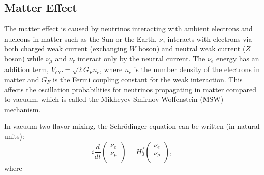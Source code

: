 %


\subsection{Matter Effect}

The matter effect is caused by neutrinos interacting with ambient electrons and nucleons in matter such as the Sun or the Earth. $\nu_e$ interacts with electrons via both charged weak current (exchanging $W$ boson) and neutral weak current ($Z$ boson) while $\nu_\mu$ and $\nu_\tau$ interact only by the neutral current. The $\nu_e$ energy has an addition term, $V_{CC} =\sqrt2G_Fn_e$, where $n_e$ is the number density of the electrons in matter and $G_F$ is the Fermi coupling constant for the weak interaction. This affects the oscillation probabilities for neutrinos propagating in matter compared to vacuum, which is called the Mikheyev-Smirnov-Wolfenstein (MSW) mechanism\cite{smirnov2016solar,smirnov2005msw}.

In vacuum two-flavor mixing, the Schr\"{o}dinger equation can be written (in natural units)\cite{xing2011neutrinos}:
\begin{equation}\label{eq:2flavor_simple}
	i\frac{d}{dt}\begin{pmatrix}
		\nu_e\\
		\nu_\mu\\
	\end{pmatrix}
	=
	H^f_0
	\begin{pmatrix}
		\nu_e\\
		\nu_\mu\\
	\end{pmatrix},
\end{equation}
where 

